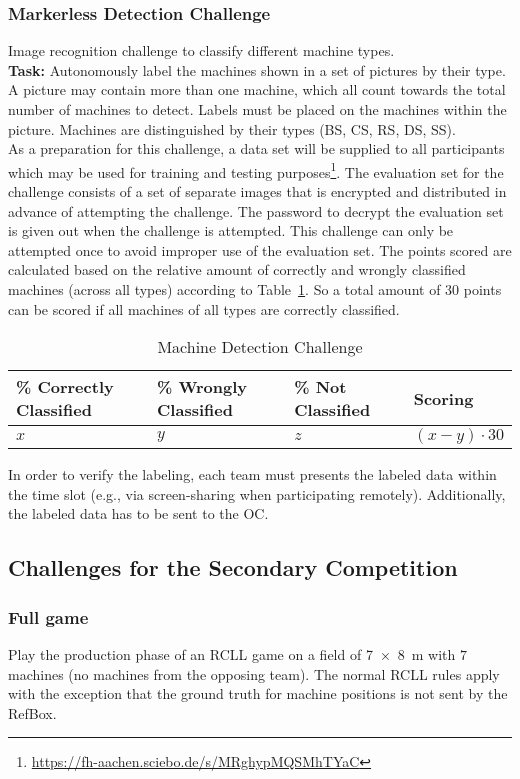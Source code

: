 \documentclass[12pt,twoside]{article}
\newcommand{\reftab}[1]{Table~\ref{#1}}
\begin{document}
\subsubsection{Markerless Detection Challenge}\label{sec:challenge-markerless}
Image recognition challenge to classify different machine types.\\
\textbf{Task:} Autonomously label the machines shown in a set of pictures
by their type.
A picture may contain more than one machine, which all count towards the
total number of machines to detect. Labels must be placed on the machines
within the picture. Machines are distinguished by their types
(BS, CS, RS, DS, SS).\\
As a preparation for this challenge, a data set will be supplied to
all participants which may be used for training and testing
purposes\footnote{\url{https://fh-aachen.sciebo.de/s/MRghypMQSMhTYaC}}.
The evaluation set for the challenge consists of a set of separate images that
is encrypted and distributed in advance of attempting the challenge.
The password to decrypt the evaluation set is given out when the challenge
is attempted.
This challenge can only be attempted once to avoid improper use of the
evaluation set.
The points scored are calculated based on the relative amount of correctly
and wrongly classified machines (across all types) according to
\reftab{tab:challenge-markerless}. So a total amount of 30 points can be scored
if all machines of all types are correctly classified.
\begin{table}[!htb]
 \centering
 \begin{tabularx}{\linewidth}{l|l|l|l}
  \% Correctly Classified & \% Wrongly Classified & \% Not Classified
  & Scoring \\\hline
  $x$ & $y$ & $z$ & $(x-y)\cdot30$
 \end{tabularx}
 \caption{Machine Detection Challenge}
 \label{tab:challenge-markerless}
\end{table}

In order to verify the labeling, each team must presents the labeled data
within the time slot (e.g., via screen-sharing when participating remotely).
Additionally, the labeled data has to be sent to the OC.

\subsection{Challenges for the Secondary Competition}

\subsubsection{Full game}\label{sec:challenge-full-game}
Play the production phase of an RCLL game on a field of \SI{7 x 8}{\metre} with
$7$ machines (no machines from the opposing team).
The normal RCLL rules apply with the exception that the ground truth for
machine positions is not sent by the RefBox.
\end{document}
